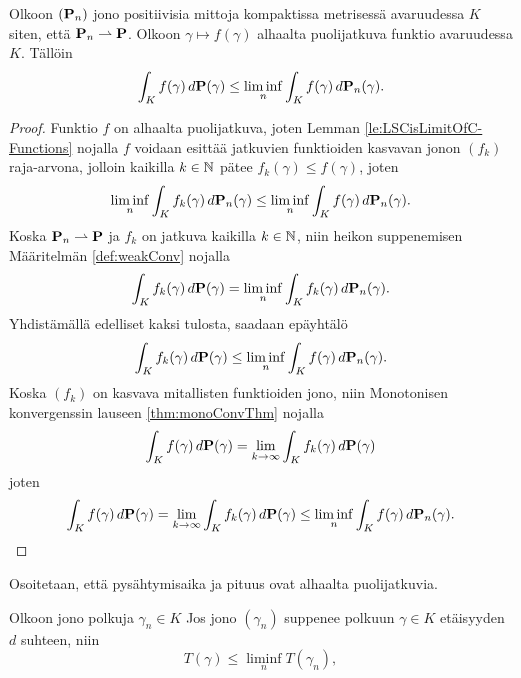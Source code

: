 \documentclass[12pt,oneside,a4paper]{amsbook} %
\begin{document}
\begin{lemma}\label{le:fdPLeLiminf}
    Olkoon $(\P_n)$ jono positiivisia mittoja kompaktissa metrisessä avaruudessa $K$ siten, että $\P_n \rightharpoonup \P$. Olkoon $\gamma \mapsto f(\gamma)$ alhaalta puolijatkuva funktio avaruudessa $K$. Tällöin
    \begin{equation*}
        \int_K f(\gamma) \, d\P(\gamma) \le \liminf_n \int_K f(\gamma) \, d\P_n(\gamma).
    \end{equation*}
\end{lemma}
\begin{proof}
    Funktio $f$ on alhaalta puolijatkuva, joten Lemman \ref{le:LSCisLimitOfC-Functions} nojalla $f$ voidaan esittää jatkuvien funktioiden kasvavan jonon $(f_k)$ raja-arvona, jolloin kaikilla $k \in \N$ pätee $f_k(\gamma) \le f(\gamma)$, joten
    \begin{equation*}
        \liminf_n \int_K f_k(\gamma) \, d\P_n(\gamma) \le \liminf_n \int_K f(\gamma)\, d\P_n(\gamma).
    \end{equation*}
    Koska $\P_n \rightharpoonup \P$ ja $f_k$ on jatkuva kaikilla $k \in \N$, niin heikon suppenemisen Määritelmän \ref{def:weakConv} nojalla
    \begin{equation*}
        \int_K f_k(\gamma) \, d\P(\gamma) = \liminf_{n} \int_K f_k(\gamma)\, d\P_n(\gamma).
    \end{equation*}
    Yhdistämällä edelliset kaksi tulosta, saadaan epäyhtälö
    \begin{equation*}\label{eq:mainThmMonoConv}
        \int_K f_k(\gamma) \, d\P(\gamma) \le \liminf_n \int_K f(\gamma) \, d\P_n(\gamma).
    \end{equation*}
    Koska $(f_k)$ on kasvava mitallisten funktioiden jono, niin Monotonisen konvergenssin lauseen \ref{thm:monoConvThm} nojalla 
    \begin{equation*}
        \int_K f(\gamma) \, d\P(\gamma) = \lim_{k\to \infty}\int_K f_k(\gamma)\, d\P(\gamma) 
    \end{equation*}
    joten
    \begin{equation*}
        \int_K f(\gamma) \, d\P(\gamma) = \lim_{k\to \infty}\int_K f_k(\gamma)\, d\P(\gamma)  \le \liminf_n \int_K f(\gamma) \, d\P_n(\gamma).
    \end{equation*}
\end{proof}
Osoitetaan, että pysähtymisaika ja pituus ovat alhaalta puolijatkuvia.
\begin{lemma}\label{le:pysahtymisajan&pituudenLSC}
    Olkoon jono polkuja $\gamma_n \in K$ Jos jono $(\gamma_n)$ suppenee polkuun $\gamma \in K$ etäisyyden $d$ suhteen, niin
    \begin{equation*}
        T(\gamma) \le \liminf_n T(\gamma_n),
    \end{equation*}
\end{lemma}
\end{document}
